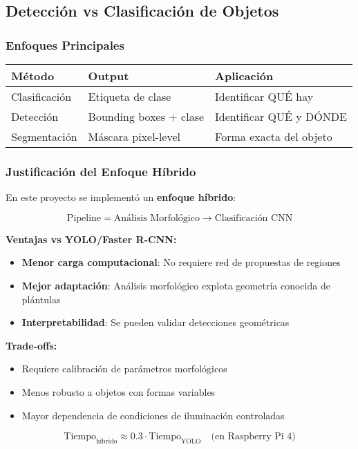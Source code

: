 \subsection{Detección vs Clasificación de Objetos}

\subsubsection{Enfoques Principales}

\begin{table}[h]
\centering
\begin{tabular}{|l|p{4cm}|p{4cm}|}
\hline
\textbf{Método} & \textbf{Output} & \textbf{Aplicación} \\ \hline
Clasificación & Etiqueta de clase & Identificar QUÉ hay \\ \hline
Detección & Bounding boxes + clase & Identificar QUÉ y DÓNDE \\ \hline
Segmentación & Máscara pixel-level & Forma exacta del objeto \\ \hline
\end{tabular}
\end{table}

\subsubsection{Justificación del Enfoque Híbrido}

En este proyecto se implementó un \textbf{enfoque híbrido}:

\begin{equation}
\text{Pipeline} = \text{Análisis Morfológico} \rightarrow \text{Clasificación CNN}
\end{equation}

\textbf{Ventajas vs YOLO/Faster R-CNN:}
\begin{itemize}
    \item \textbf{Menor carga computacional}: No requiere red de propuestas de regiones
    \item \textbf{Mejor adaptación}: Análisis morfológico explota geometría conocida de plántulas
    \item \textbf{Interpretabilidad}: Se pueden validar detecciones geométricas
\end{itemize}

\textbf{Trade-offs:}
\begin{itemize}
    \item Requiere calibración de parámetros morfológicos
    \item Menos robusto a objetos con formas variables
    \item Mayor dependencia de condiciones de iluminación controladas
\end{itemize}

\begin{equation}
\text{Tiempo}_{\text{híbrido}} \approx 0.3 \cdot \text{Tiempo}_{\text{YOLO}} \quad \text{(en Raspberry Pi 4)}
\end{equation}